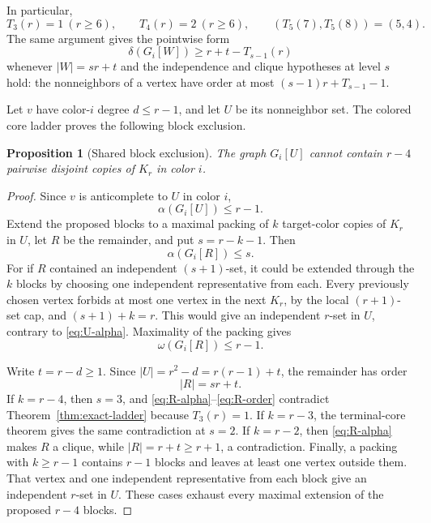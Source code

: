 \documentclass[11pt,reqno,a4paper]{amsart}
\newtheorem{proposition}[theorem]{Proposition}
\theoremstyle{definition}
\theoremstyle{remark}
\begin{document}
In particular,
\begin{equation}\label{eq:threshold-values}
 T_3(r)=1\ (r\geq6),\qquad T_4(r)=2\ (r\geq6),
 \qquad (T_5(7),T_5(8))=(5,4).
\end{equation}
The same argument gives the pointwise form
\begin{equation}\label{eq:residual-min-degree}
 \delta(G_i[W])\geq r+t-T_{s-1}(r)
\end{equation}
whenever $|W|=sr+t$ and the independence and clique hypotheses at
level $s$ hold: the nonneighbors of a vertex have order at most
$(s-1)r+T_{s-1}-1$.

Let $v$ have color-$i$ degree $d\leq r-1$, and let $U$ be its nonneighbor
set. The colored core ladder proves the following block exclusion.

\begin{proposition}[Shared block exclusion]\label{prop:block-exclusion}
The graph $G_i[U]$ cannot contain $r-4$ pairwise disjoint copies of
$K_r$ in color $i$.
\end{proposition}

\begin{proof}
Since $v$ is anticomplete to $U$ in color $i$,
\begin{equation}\label{eq:U-alpha}
  \alpha(G_i[U])\leq r-1.
\end{equation}
Extend the proposed blocks to a maximal packing of $k$ target-color
copies of $K_r$ in $U$, let $R$ be the remainder, and put
$s=r-k-1$. Then
\begin{equation}\label{eq:R-alpha}
  \alpha(G_i[R])\leq s.
\end{equation}
For if $R$ contained an independent $(s+1)$-set, it could be extended
through the $k$ blocks by choosing one independent representative from
each. Every previously chosen vertex forbids at most one vertex in the
next $K_r$, by the local $(r+1)$-set cap, and
$(s+1)+k=r$. This would give an independent $r$-set in $U$, contrary to
\eqref{eq:U-alpha}. Maximality of the packing gives
\begin{equation}\label{eq:R-omega}
  \omega(G_i[R])\leq r-1.
\end{equation}

Write $t=r-d\geq1$. Since $|U|=r^2-d=r(r-1)+t$, the remainder has
order
\begin{equation}\label{eq:R-order}
  |R|=sr+t.
\end{equation}
If $k=r-4$, then $s=3$, and
\eqref{eq:R-alpha}--\eqref{eq:R-order} contradict
Theorem~\ref{thm:exact-ladder} because $T_3(r)=1$. If $k=r-3$, the
terminal-core theorem gives the same contradiction at $s=2$. If
$k=r-2$, then \eqref{eq:R-alpha} makes $R$ a clique, while
$|R|=r+t\geq r+1$, a contradiction. Finally, a packing with
$k\geq r-1$ contains $r-1$ blocks and leaves at least one vertex outside
them. That vertex and one independent representative from each block
give an independent $r$-set in $U$. These cases exhaust every maximal
extension of the proposed $r-4$ blocks.
\end{proof}
\end{document}
